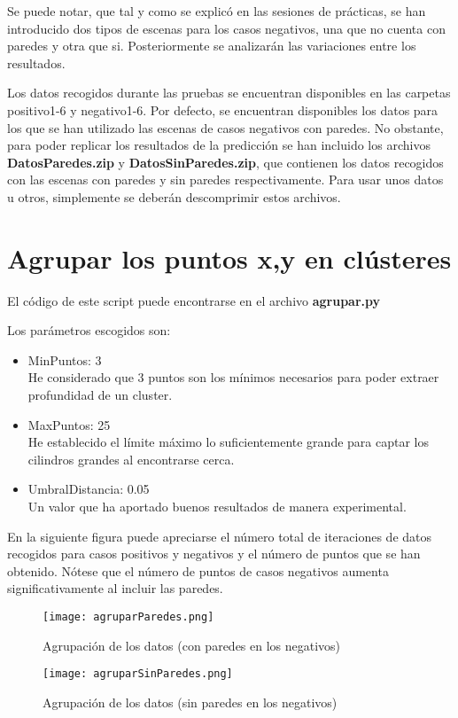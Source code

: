 Se puede notar, que tal y como se explicó en las sesiones de prácticas, se han introducido dos tipos de escenas para los casos negativos, una que no cuenta con paredes y otra que si. Posteriormente se analizarán las variaciones entre los resultados.

Los datos recogidos durante las pruebas se encuentran disponibles en las carpetas positivo1-6 y negativo1-6. Por defecto, se encuentran disponibles los datos para los que se han utilizado las escenas de casos negativos con paredes.
No obstante, para poder replicar los resultados de la predicción se han incluido los archivos \textbf{DatosParedes.zip} y \textbf{DatosSinParedes.zip}, que contienen los datos recogidos con las escenas con paredes y sin paredes respectivamente. Para usar unos datos u otros, simplemente se deberán descomprimir estos archivos.

\newpage

\section{Agrupar los puntos x,y en clústeres}

El código de este script puede encontrarse en el archivo \textbf{agrupar.py}

Los parámetros escogidos son:
\begin{itemize}
	\item MinPuntos: 3 \\ He considerado que 3 puntos son los mínimos necesarios para poder extraer profundidad de un cluster.
	\item MaxPuntos: 25 \\ He establecido el límite máximo lo suficientemente grande para captar los cilindros grandes al encontrarse cerca.
	\item UmbralDistancia: 0.05 \\ Un valor que ha aportado buenos resultados de manera experimental.
\end{itemize}

En la siguiente figura puede apreciarse el número total de iteraciones de datos recogidos para casos positivos y negativos y el número de puntos que se han obtenido. Nótese que el número de puntos de casos negativos aumenta significativamente al incluir las paredes.

\begin{figure}[H]
	\centering
	\texttt{[image: agruparParedes.png]}
	\caption{Agrupación de los datos (con paredes en los negativos)}
\end{figure}
\begin{figure}[H]
	\centering
	\texttt{[image: agruparSinParedes.png]}
	\caption{Agrupación de los datos (sin paredes en los negativos)}
\end{figure}

